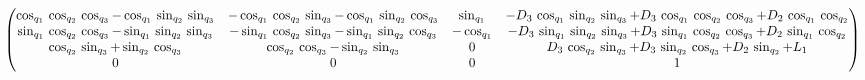 $$\ifx\endpmatrix\undefined\pmatrix{\else\begin{pmatrix}\fi \cos _{
 q_{1}}\,\cos _{q_{2}}\,\cos _{q_{3}}-\cos _{q_{1}}\,\sin _{q_{2}}\,
 \sin _{q_{3}}&-\cos _{q_{1}}\,\cos _{q_{2}}\,\sin _{q_{3}}-\cos _{
 q_{1}}\,\sin _{q_{2}}\,\cos _{q_{3}}&\sin _{q_{1}}&-D_{3}\,\cos _{
 q_{1}}\,\sin _{q_{2}}\,\sin _{q_{3}}+D_{3}\,\cos _{q_{1}}\,\cos _{
 q_{2}}\,\cos _{q_{3}}+D_{2}\,\cos _{q_{1}}\,\cos _{q_{2}}\cr \sin _{
 q_{1}}\,\cos _{q_{2}}\,\cos _{q_{3}}-\sin _{q_{1}}\,\sin _{q_{2}}\,
 \sin _{q_{3}}&-\sin _{q_{1}}\,\cos _{q_{2}}\,\sin _{q_{3}}-\sin _{
 q_{1}}\,\sin _{q_{2}}\,\cos _{q_{3}}&-\cos _{q_{1}}&-D_{3}\,\sin _{
 q_{1}}\,\sin _{q_{2}}\,\sin _{q_{3}}+D_{3}\,\sin _{q_{1}}\,\cos _{
 q_{2}}\,\cos _{q_{3}}+D_{2}\,\sin _{q_{1}}\,\cos _{q_{2}}\cr \cos _{
 q_{2}}\,\sin _{q_{3}}+\sin _{q_{2}}\,\cos _{q_{3}}&\cos _{q_{2}}\,
 \cos _{q_{3}}-\sin _{q_{2}}\,\sin _{q_{3}}&0&D_{3}\,\cos _{q_{2}}\,
 \sin _{q_{3}}+D_{3}\,\sin _{q_{2}}\,\cos _{q_{3}}+D_{2}\,\sin _{
 q_{2}}+L_{1}\cr 0&0&0&1\cr 
 \ifx\endpmatrix\undefined}\else\end{pmatrix}\fi $$
